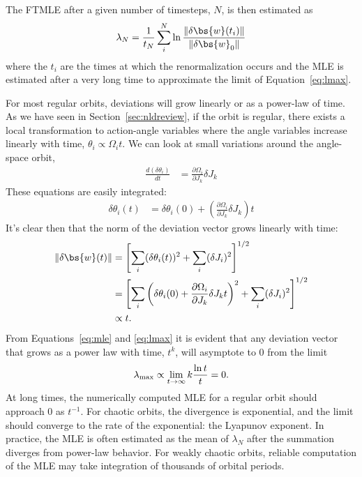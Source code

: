 The FTMLE after a given number of timesteps, $N$, is then estimated as
\begin{equation}
	\lambda_N = \frac{1}{t_N}\sum_i^N \ln \frac{\|\delta \bs{w}(t_i)\|}{\|\delta \bs{w}_0\|} \label{eq:ftmle}
\end{equation}
where the $t_i$ are the times at which the renormalization occurs and the MLE is
estimated after a very long time to approximate the limit of
Equation~\ref{eq:lmax}.

For most regular orbits, deviations will grow linearly or as a power-law of
time. As we have seen in Section~\ref{sec:nldreview}, if the orbit is regular,
there exists a local transformation to action-angle variables where the angle
variables increase linearly with time, $\theta_i \propto \Omega_i t$. We can
look at small variations around the angle-space orbit,
\begin{align}
	\frac{d (\delta \theta_i)}{dt} &= \frac{\partial \Omega_i}{\partial J_k} \delta J_k
\end{align}
These equations are easily integrated:
\begin{align}
	\delta \theta_i(t) &= \delta \theta_i(0) + \left(\frac{\partial \Omega_i}{\partial J_k} \delta J_k \right) t
\end{align}
It's clear then that the norm of the deviation vector grows linearly with time:
\begin{align}
	\|\delta \bs{w}(t)\| &= \left[\sum_i (\delta \theta_i(t))^2 + \sum_i (\delta J_i)^2\right]^{1/2}\\
	&= \left[\sum_i \left(\delta \theta_i(0) + \frac{\partial \Omega_i}{\partial J_k} \delta J_k t\right)^2 + \sum_i (\delta J_i)^2\right]^{1/2}\\
	&\propto t.
\end{align}
From Equations~\ref{eq:mle} and \ref{eq:lmax} it is evident that any deviation vector that grows as a power law with time, $t^k$, will asymptote to 0 from the limit
\begin{equation}
	\lambda_{\rm max} \propto \lim_{t\rightarrow \infty} k \frac{\ln t}{t} = 0.
\end{equation}
At long times, the numerically computed MLE for a regular orbit should approach
0 as $t^{-1}$. For chaotic orbits, the divergence is exponential, and the limit
should converge to the rate of the exponential: the Lyapunov exponent. In
practice, the MLE is often estimated as the mean of $\lambda_N$ after the
summation diverges from power-law behavior. For weakly chaotic orbits, reliable
computation of the MLE may take integration of thousands of orbital periods.

